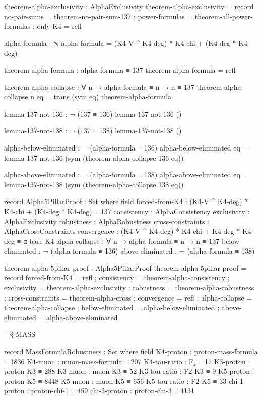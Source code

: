 \documentclass[11pt,a4paper]{book}
\begin{document}
\begin{code}
theorem-alpha-exclusivity : AlphaExclusivity
theorem-alpha-exclusivity = record
  { no-pair-sums   = theorem-no-pair-sum-137
  ; power-formulas = theorem-all-power-formulas
  ; only-K4        = refl
  }


alpha-formula : ℕ
alpha-formula = (K4-V ^ K4-deg) * K4-chi + (K4-deg * K4-deg)

theorem-alpha-formula : alpha-formula ≡ 137
theorem-alpha-formula = refl

theorem-alpha-collapse : ∀ n → alpha-formula ≡ n → n ≡ 137
theorem-alpha-collapse n eq = trans (sym eq) theorem-alpha-formula

lemma-137-not-136 : ¬ (137 ≡ 136)
lemma-137-not-136 ()

lemma-137-not-138 : ¬ (137 ≡ 138)
lemma-137-not-138 ()

alpha-below-eliminated : ¬ (alpha-formula ≡ 136)
alpha-below-eliminated eq = lemma-137-not-136 (sym (theorem-alpha-collapse 136 eq))

alpha-above-eliminated : ¬ (alpha-formula ≡ 138)
alpha-above-eliminated eq = lemma-137-not-138 (sym (theorem-alpha-collapse 138 eq))

record Alpha5PillarProof : Set where
  field
    forced-from-K4      : (K4-V ^ K4-deg) * K4-chi + (K4-deg * K4-deg) ≡ 137
    consistency         : AlphaConsistency
    exclusivity         : AlphaExclusivity
    robustness          : AlphaRobustness
    cross-constraints   : AlphaCrossConstraints
    convergence         : (K4-V ^ K4-deg) * K4-chi + K4-deg * K4-deg ≡ α-bare-K4
    alpha-collapse      : ∀ n → alpha-formula ≡ n → n ≡ 137
    below-eliminated    : ¬ (alpha-formula ≡ 136)
    above-eliminated    : ¬ (alpha-formula ≡ 138)

theorem-alpha-5pillar-proof : Alpha5PillarProof
theorem-alpha-5pillar-proof = record
  { forced-from-K4    = refl
  ; consistency       = theorem-alpha-consistency
  ; exclusivity       = theorem-alpha-exclusivity
  ; robustness        = theorem-alpha-robustness
  ; cross-constraints = theorem-alpha-cross
  ; convergence       = refl
  ; alpha-collapse    = theorem-alpha-collapse
  ; below-eliminated  = alpha-below-eliminated
  ; above-eliminated  = alpha-above-eliminated
  }


-- § MASS

record MassFormulaRobustness : Set where
  field
    K4-proton     : proton-mass-formula ≡ 1836
    K4-muon       : muon-mass-formula ≡ 207
    K4-tau-ratio  : F₂ ≡ 17
    K3-proton     : proton-K3 ≡ 288
    K3-muon       : muon-K3 ≡ 52
    K3-tau-ratio  : F2-K3 ≡ 9
    K5-proton     : proton-K5 ≡ 8448
    K5-muon       : muon-K5 ≡ 656
    K5-tau-ratio  : F2-K5 ≡ 33
    chi-1-proton  : proton-chi-1 ≡ 459
    chi-3-proton  : proton-chi-3 ≡ 4131


\end{code}
\end{document}

